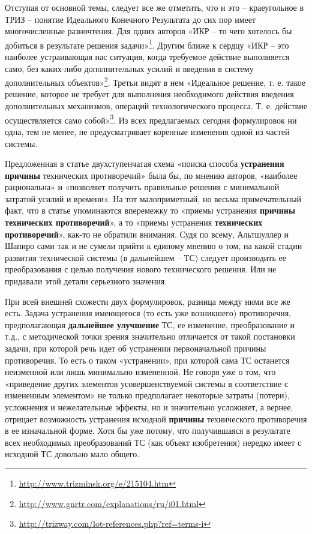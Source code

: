 \documentclass[11pt,a4paper]{article}
\begin{document}
Отступая от основной темы, следует все же отметить, что и это -- краеугольное
в ТРИЗ -- понятие Идеального Конечного Результата до сих пор имеет
многочисленные разночтения. Для одних авторов «ИКР -- то чего хотелось бы
добиться в результате решения
задачи»\footnote{\url{http://www.trizminsk.org/e/215104.htm}}. Другим ближе к
сердцу «ИКР -- это наиболее устраивающая нас ситуация, когда требуемое
действие выполняется само, без каких-либо дополнительных усилий и введения в
систему дополнительных
объектов»\footnote{\url{http://www.gnrtr.com/explanations/ru/i01.html}}.
Третьи видят в нем «Идеальное решение, т. е. такое решение, которое не требует
для выполнения необходимого действия введения дополнительных механизмов,
операций технологического процесса. Т. е. действие осуществляется само
собой»\footnote{\url{http://trizway.com/lot-references.php?ref=terms-i}}. Из
всех предлагаемых сегодня формулировок ни одна, тем не менее, не
предусматривает коренные изменения одной из частей системы.

Предложенная в статье \cite{Altshuller1956} двухступенчатая схема «поиска
способа \textbf{устранения причины} технических противоречий» была бы, по
мнению авторов, «наиболее рациональна» и «позволяет получить правильные
решения с минимальной затратой усилий и времени». На тот малоприметный, но
весьма примечательный факт, что в статье упоминаются вперемежку то «приемы
устранения \textbf{причины технических противоречий}», а то «приемы устранения
\textbf{технических противоречий}», как-то не обратили внимания. Судя по
всему, Альтшуллер и Шапиро сами так и не сумели прийти к единому мнению о том,
на какой стадии развития технической системы (в дальнейшем -- ТС) следует
производить ее преобразования с целью получения нового технического
решения. Или не придавали этой детали серьезного значения.

При всей внешней схожести двух формулировок, разница между ними все же есть.
Задача устранения имеющегося (то есть уже возникшего) противоречия,
предполагающая \textbf{дальнейшее улучшение} ТС, ее изменение, преобразование
и т.д., с методической точки зрения значительно отличается от такой постановки
задачи, при которой речь идет об устранении первоначальной причины
противоречия. То есть о таком «устранении», при которой сама ТС останется
неизменной или лишь минимально измененной. Не говоря уже о том, что
«приведение других элементов усовершенствуемой системы в соответствие с
измененным элементом» не только предполагает некоторые затраты (потери),
усложнения и нежелательные эффекты, но и значительно усложняет, а вернее,
отрицает возможность устранения исходной \textbf{причины} технического
противоречия в ее изначальной форме. Хотя бы уже потому, что получившаяся в
результате всех необходимых преобразований ТС (как объект изобретения) нередко
имеет с исходной ТС довольно мало общего.
\end{document}
